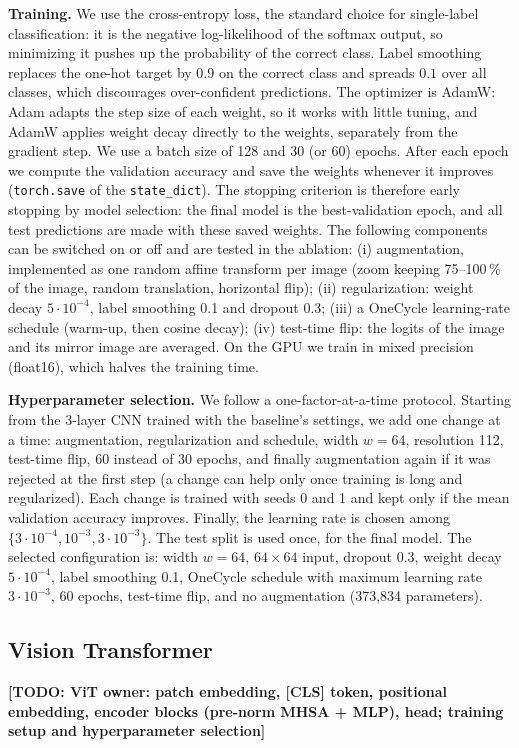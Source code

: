 \documentclass[conference]{IEEEtran}
\newcommand{\todo}[1]{\textbf{[TODO: #1]}}
\begin{document}
\textbf{Training.} We use the cross-entropy loss, the standard choice for single-label classification: it is the negative log-likelihood of the softmax output, so minimizing it pushes up the probability of the correct class. Label smoothing replaces the one-hot target by $0.9$ on the correct class and spreads $0.1$ over all classes, which discourages over-confident predictions. The optimizer is AdamW: Adam adapts the step size of each weight, so it works with little tuning, and AdamW applies weight decay directly to the weights, separately from the gradient step. We use a batch size of 128 and 30 (or 60) epochs. After each epoch we compute the validation accuracy and save the weights whenever it improves (\texttt{torch.save} of the \texttt{state\_dict}). The stopping criterion is therefore early stopping by model selection: the final model is the best-validation epoch, and all test predictions are made with these saved weights. The following components can be switched on or off and are tested in the ablation: (i) augmentation, implemented as one random affine transform per image (zoom keeping 75--100\,\% of the image, random translation, horizontal flip); (ii) regularization: weight decay $5\cdot10^{-4}$, label smoothing 0.1 and dropout 0.3; (iii) a OneCycle learning-rate schedule (warm-up, then cosine decay); (iv) test-time flip: the logits of the image and its mirror image are averaged. On the GPU we train in mixed precision (float16), which halves the training time.

\textbf{Hyperparameter selection.} We follow a one-factor-at-a-time protocol. Starting from the 3-layer CNN trained with the baseline's settings, we add one change at a time: augmentation, regularization and schedule, width $w=64$, resolution 112, test-time flip, 60 instead of 30 epochs, and finally augmentation again if it was rejected at the first step (a change can help only once training is long and regularized). Each change is trained with seeds 0 and 1 and kept only if the mean validation accuracy improves. Finally, the learning rate is chosen among $\{3\cdot10^{-4}, 10^{-3}, 3\cdot10^{-3}\}$. The test split is used once, for the final model. The selected configuration is: width $w=64$, $64\times64$ input, dropout 0.3, weight decay $5\cdot10^{-4}$, label smoothing 0.1, OneCycle schedule with maximum learning rate $3\cdot10^{-3}$, 60 epochs, test-time flip, and no augmentation (373{,}834 parameters).

\subsection{Vision Transformer}
\todo{ViT owner: patch embedding, [CLS] token, positional embedding, encoder blocks (pre-norm MHSA + MLP), head; training setup and hyperparameter selection}
\end{document}
